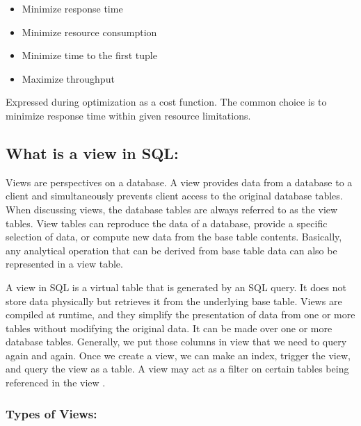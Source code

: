 \begin{itemize}
    \item Minimize response time
    \item Minimize resource consumption
    \item Minimize time to the first tuple
    \item Maximize throughput
\end{itemize}\vspace{.4cm}

Expressed during optimization as a cost function. The common choice is to minimize response time within given resource limitations.



\subsection{What is a view in SQL:}
Views are perspectives on a database. A view provides data from a database to a client and simultaneously prevents client access to the original database tables. When discussing views, the database tables are always referred to as the view tables. View tables can reproduce the data of a database, provide a specific selection of data, or compute new data from the base table contents. Basically, any analytical operation that can be derived from base table data can also be represented in a view table.\vspace{.4cm}

A view in SQL is a virtual table that is generated by an SQL query. It does not store data physically but retrieves it from the underlying base table. Views are compiled at runtime, and they simplify the presentation of data from one or more tables without modifying the original data. It can be made over one or more database tables. Generally, we put those columns in view that we need to query again and again. Once we create a view, we can make an index, trigger the view, and query the view as a table. A view may act as a filter on certain tables being referenced in the view \cite{chauhan-2024, Rohan_Vats-2024}.

\subsubsection{Types of Views:}

